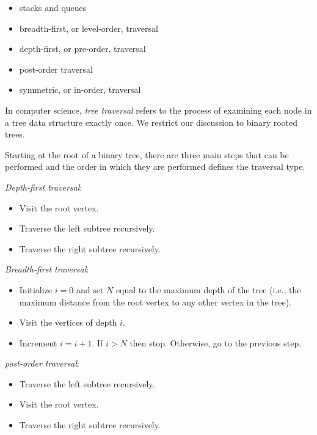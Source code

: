 \begin{itemize}
\item stacks and queues

\item breadth-first, or level-order, traversal

\item depth-first, or pre-order, traversal

\item post-order traversal

\item symmetric, or in-order, traversal
\end{itemize}

In computer science, {\it tree traversal} refers to the process of
examining each node in a tree data structure exactly once.
We restrict our discussion to binary rooted trees.

Starting at the root of a binary tree, there are three main steps that
can be performed and the order in which they are performed defines the
traversal type.

\noindent
{\it Depth-first traversal}:
\begin{itemize}
\item
Visit the root vertex.

\item
Traverse the left subtree recursively.

\item
Traverse the right subtree recursively.

\end{itemize}


\noindent
{\it Breadth-first traversal}:
\begin{itemize}
\item
Initialize $i=0$ and set $N$ equal to the maximum depth
of the tree (i.e., the maximum distance from the root vertex
to any other vertex in the tree).

\item
Visit the vertices of depth $i$.

\item
Increment $i=i+1$. If $i>N$ then stop. Otherwise, go to
the previous step.

\end{itemize}


\noindent
{\it post-order traversal}:
\begin{itemize}
\item
Traverse the left subtree recursively.

\item
Visit the root vertex.

\item
Traverse the right subtree recursively.

\end{itemize}


